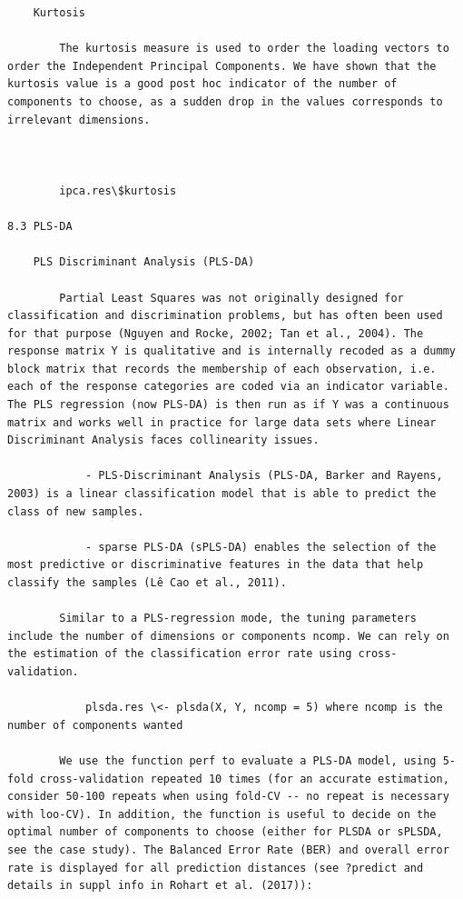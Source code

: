 \documentclass[
]{book}
\begin{document}
\begin{verbatim}
    Kurtosis

        The kurtosis measure is used to order the loading vectors to order the Independent Principal Components. We have shown that the kurtosis value is a good post hoc indicator of the number of components to choose, as a sudden drop in the values corresponds to irrelevant dimensions.



        ipca.res\$kurtosis

8.3 PLS-DA

    PLS Discriminant Analysis (PLS-DA)

        Partial Least Squares was not originally designed for classification and discrimination problems, but has often been used for that purpose (Nguyen and Rocke, 2002; Tan et al., 2004). The response matrix Y is qualitative and is internally recoded as a dummy block matrix that records the membership of each observation, i.e. each of the response categories are coded via an indicator variable. The PLS regression (now PLS-DA) is then run as if Y was a continuous matrix and works well in practice for large data sets where Linear Discriminant Analysis faces collinearity issues.

            - PLS-Discriminant Analysis (PLS-DA, Barker and Rayens, 2003) is a linear classification model that is able to predict the class of new samples.

            - sparse PLS-DA (sPLS-DA) enables the selection of the most predictive or discriminative features in the data that help classify the samples (Lê Cao et al., 2011).

        Similar to a PLS-regression mode, the tuning parameters include the number of dimensions or components ncomp. We can rely on the estimation of the classification error rate using cross-validation.

            plsda.res \<- plsda(X, Y, ncomp = 5) where ncomp is the number of components wanted

        We use the function perf to evaluate a PLS-DA model, using 5-fold cross-validation repeated 10 times (for an accurate estimation, consider 50-100 repeats when using fold-CV -- no repeat is necessary with loo-CV). In addition, the function is useful to decide on the optimal number of components to choose (either for PLSDA or sPLSDA, see the case study). The Balanced Error Rate (BER) and overall error rate is displayed for all prediction distances (see ?predict and details in suppl info in Rohart et al. (2017)):


\end{verbatim}
\end{document}
